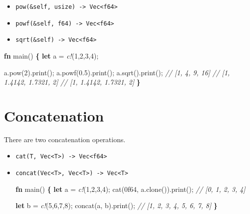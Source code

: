 \documentclass[]{book}
\newenvironment{Shaded}{\begin{snugshade}}{\end{snugshade}}
\newcommand{\CommentTok}[1]{\textcolor[rgb]{0.56,0.35,0.01}{\textit{#1}}}
\newcommand{\DecValTok}[1]{\textcolor[rgb]{0.00,0.00,0.81}{#1}}
\newcommand{\KeywordTok}[1]{\textcolor[rgb]{0.13,0.29,0.53}{\textbf{#1}}}
\newcommand{\NormalTok}[1]{#1}
\newcommand{\OperatorTok}[1]{\textcolor[rgb]{0.81,0.36,0.00}{\textbf{#1}}}
\newcommand{\PreprocessorTok}[1]{\textcolor[rgb]{0.56,0.35,0.01}{\textit{#1}}}
\providecommand{\tightlist}{%
  \setlength{\itemsep}{0pt}\setlength{\parskip}{0pt}}
\begin{document}
\begin{itemize}
  \begin{itemize}
  \tightlist
  \item
    \texttt{pow(\&self,\ usize)\ -\textgreater{}\ Vec\textless{}f64\textgreater{}}
  \item
    \texttt{powf(\&self,\ f64)\ -\textgreater{}\ Vec\textless{}f64\textgreater{}}
  \item
    \texttt{sqrt(\&self)\ -\textgreater{}\ Vec\textless{}f64\textgreater{}}
  \end{itemize}

\begin{Shaded}
\begin{Highlighting}[]
\KeywordTok{fn}\NormalTok{ main() }\OperatorTok{\{}
    \KeywordTok{let}\NormalTok{ a = }\PreprocessorTok{c!}\NormalTok{(}\DecValTok{1}\NormalTok{,}\DecValTok{2}\NormalTok{,}\DecValTok{3}\NormalTok{,}\DecValTok{4}\NormalTok{);}

\NormalTok{    a.pow(}\DecValTok{2}\NormalTok{).print();}
\NormalTok{    a.powf(}\DecValTok{0.5}\NormalTok{).print();}
\NormalTok{    a.sqrt().print();}
    \CommentTok{// [1, 4, 9, 16]}
    \CommentTok{// [1, 1.4142, 1.7321, 2]}
    \CommentTok{// [1, 1.4142, 1.7321, 2]}
\OperatorTok{\}}
\end{Highlighting}
\end{Shaded}
\end{itemize}

\hypertarget{concatenation}{%
\section{Concatenation}\label{concatenation}}

There are two concatenation operations.

\begin{itemize}
\item
  \texttt{cat(T,\ Vec\textless{}T\textgreater{})\ -\textgreater{}\ Vec\textless{}f64\textgreater{}}
\item
  \texttt{concat(Vec\textless{}T\textgreater{},\ Vec\textless{}T\textgreater{})\ -\textgreater{}\ Vec\textless{}T\textgreater{}}

\begin{Shaded}
\begin{Highlighting}[]
\KeywordTok{fn}\NormalTok{ main() }\OperatorTok{\{}
    \KeywordTok{let}\NormalTok{ a = }\PreprocessorTok{c!}\NormalTok{(}\DecValTok{1}\NormalTok{,}\DecValTok{2}\NormalTok{,}\DecValTok{3}\NormalTok{,}\DecValTok{4}\NormalTok{);}
\NormalTok{    cat(}\DecValTok{0f64}\NormalTok{, a.clone()).print();}
    \CommentTok{// [0, 1, 2, 3, 4]}

    \KeywordTok{let}\NormalTok{ b = }\PreprocessorTok{c!}\NormalTok{(}\DecValTok{5}\NormalTok{,}\DecValTok{6}\NormalTok{,}\DecValTok{7}\NormalTok{,}\DecValTok{8}\NormalTok{);}
\NormalTok{    concat(a, b).print();}
    \CommentTok{// [1, 2, 3, 4, 5, 6, 7, 8]}
\OperatorTok{\}}
\end{Highlighting}
\end{Shaded}
\end{itemize}
\end{document}
